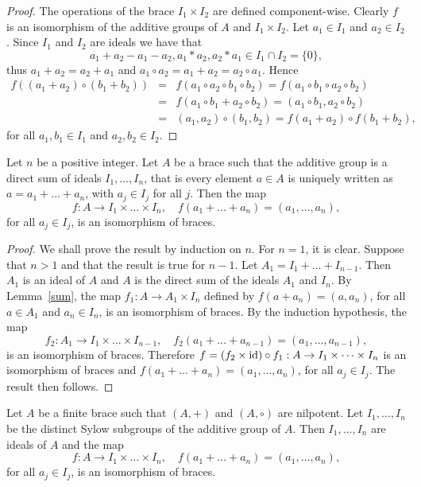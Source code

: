 \begin{proof}
The operations of the brace $I_1\times I_2$
are defined component-wise. Clearly $f$ is an isomorphism of the
additive groups of $A$ and $I_1\times I_2$. Let $a_1\in I_1$ and
$a_2\in I_2$. Since $I_1$ and $I_2$ are ideals we have that
$$a_1+a_2-a_1-a_2, a_1*a_2, a_2*a_1\in I_1\cap I_2=\{ 0\},$$
thus $a_1+a_2=a_2+a_1$ and $a_1\circ a_2=a_1+a_2=a_2\circ a_1$.
Hence
\begin{eqnarray*} f((a_1+a_2)\circ (b_1+b_2))&=&f(a_1\circ
a_2\circ b_1\circ b_2)=
f(a_1\circ b_1\circ a_2\circ b_2)\\
&=&f(a_1\circ b_1 + a_2\circ b_2)=(a_1\circ b_1 , a_2\circ b_2)\\
&=&(a_1,a_2)\circ (b_1,b_2)=f(a_1+a_2)\circ f(b_1 +b_2),
\end{eqnarray*}
for all $a_1,b_1\in I_1$ and $a_2,b_2\in I_2$. 
\end{proof}

\begin{theorem}
    \label{thm:direct}
    Let $n$ be a positive integer. Let $A$ be a brace such that the additive
group is a direct sum of ideals $I_1,\dots ,I_n$, that is every
element $a\in A$ is uniquely written as $a=a_1+\dots +a_n$, with
$a_j\in I_j$ for all $j$. Then the map \[
f:A\rightarrow
I_1\times\dots\times I_n,
\quad
f(a_1+\dots +a_n)=(a_1,\dots
,a_n),
\]
for all $a_j\in I_j$, is an isomorphism of braces.
\end{theorem}

\begin{proof}
We shall prove the result by induction on $n$. For $n=1$, it is
clear. Suppose that $n>1$ and that the result is true for $n-1$. Let
$A_1=I_1+\dots +I_{n-1}$. Then $A_1$ is an ideal of $A$ and $A$ is
the direct sum of the ideals $A_1$ and $I_n$. By Lemma~\ref{sum},
the map $f_1: A\rightarrow A_1\times I_n$ defined by
$f(a+a_n)=(a,a_n)$, for all $a\in A_1$ and $a_n\in I_n$, is an
isomorphism of braces. By the induction hypothesis, the
map
\[
    f_2:A_1\rightarrow I_1\times \dots\times I_{n-1},
    \quad
    f_2(a_1+\dots +a_{n-1})=(a_1,\dots ,a_{n-1}),
\]
is an isomorphism of braces. Therefore $f=(f_2\times
\operatorname{id})\circ f_1:A\rightarrow I_1\times\dots\times I_n$ is an
isomorphism of braces and $f(a_1+\dots +a_n)=(a_1,\dots
,a_n)$, for all $a_j\in I_j$. The result then follows.
\end{proof}

\begin{corollary}
    \label{cor:product}
    Let $A$ be a finite brace such that $(A,+)$ and $(A,\circ)$ are nilpotent.
Let $I_1,\dots ,I_n$ be the distinct Sylow subgroups of the additive
group of $A$. Then $I_1,\dots ,I_n$ are ideals of $A$ and the map
\[
f:A\rightarrow I_1\times\dots\times I_n,
\quad
f(a_1+\dots+a_n)=(a_1,\dots ,a_n),
\]
for all $a_j\in I_j$, is an isomorphism of
braces.
\end{corollary}

